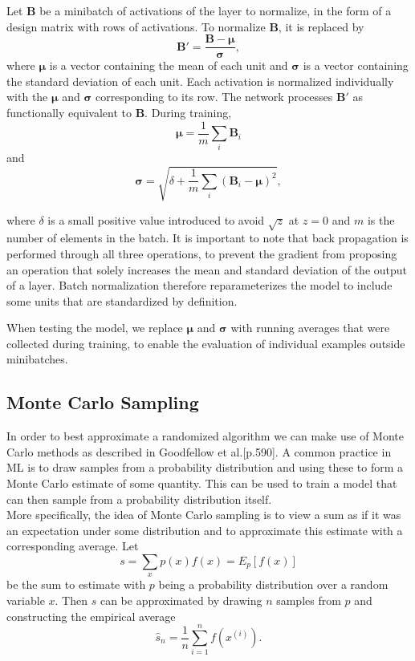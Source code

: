 Let $\mathbf{B}$ be a minibatch of activations of the layer to normalize, in the form of a design matrix with rows of activations. To normalize $\mathbf{B}$, it is replaced by
\begin{equation}
    \mathbf{B}' = \frac{\mathbf{B} - \boldsymbol{\mu}}{\boldsymbol{\sigma}},
\end{equation}
where $\boldsymbol{\mu}$ is a vector containing the mean of each unit and $\boldsymbol{\sigma}$ is a vector containing the standard deviation of each unit. Each activation is normalized individually with the $\boldsymbol{\mu}$ and $\boldsymbol{\sigma}$ corresponding to its row. The network processes $\mathbf{B}'$ as functionally equivalent to $\mathbf{B}$. During training,
\begin{equation}
    \boldsymbol{\mu} = \frac{1}{m}\sum_i \mathbf{B}_i
\end{equation}
and
\begin{equation}
    \boldsymbol{\sigma} = \sqrt{\delta + \frac{1}{m} \sum_i (\mathbf{B}_i - \boldsymbol{\mu})^2},
\end{equation}

where $\delta$ is a small positive value introduced to avoid $\sqrt{z}$ at $z = 0$ and $m$ is the number of elements in the batch. It is important to note that back propagation is performed through all three operations, to prevent the gradient from proposing an operation that solely increases the mean and standard deviation of the output of a layer. Batch normalization therefore reparameterizes the model to include some units that are standardized by definition.

When testing the model, we replace $\boldsymbol{\mu}$ and $\boldsymbol{\sigma}$ with running averages that were collected during training, to enable the evaluation of individual examples outside minibatches.

\subsection{Monte Carlo Sampling}
In order to best approximate a randomized algorithm we can make use of Monte Carlo methods as described in Goodfellow et al.\cite{Goodfellow-et-al-2016}[p.590]. A common practice in ML is to draw samples from a probability distribution and using these to form a Monte Carlo estimate of some quantity. This can be used to train a model that can then sample from a probability distribution itself. \\
More specifically, the idea of Monte Carlo sampling is to view a sum as if it was an expectation under some distribution and to approximate this estimate with a corresponding average.
Let 
\begin{equation}
    s = \sum_x p(x)f(x)=E_p[f(x)]
\end{equation}
be the sum to estimate with $p$ being a probability distribution over a random variable $x$. Then $s$ can be approximated by drawing $n$ samples from $p$ and constructing the empirical average 
\begin{equation}
    \hat{s}_n=\frac{1}{n}\sum_{i=1}^n f(x^{(i)}).
\end{equation}


